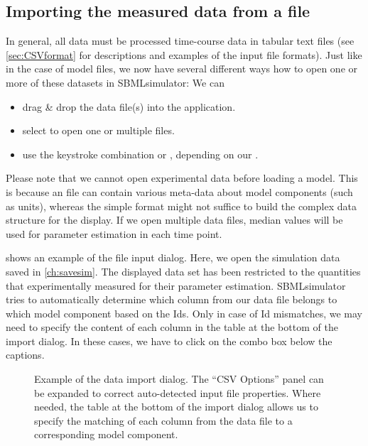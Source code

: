 \subsection{Importing the measured data from a file}
\label{sec:opendata}

In general, all data must be processed time-course data in tabular text files (see \cref{sec:CSVformat} for descriptions and examples of the input file formats).
Just like in the case of model files, we now have several different ways how to open one or more of these datasets in SBMLsimulator: We can
\begin{itemize}
  \item drag \& drop the data file(s) into the application.
  \item select  to open one or multiple files.
  \item use the keystroke combination  or , depending on our \OS.
\end{itemize}
Please note that we cannot open experimental data before loading a model.
This is because an \SBML file can contain various meta-data about model components (such as units), whereas the simple \CSV format might not suffice to build the complex data structure for the display.
If we open multiple data files, median values will be used for parameter estimation in each time point.

 shows an example of the file input dialog.
Here, we open the simulation data saved in \cref{ch:savesim}.
The displayed data set has been restricted to the quantities that \citeauthor{Bucher2011} experimentally measured for their parameter estimation.
SBMLsimulator tries to automatically determine which column from our data file belongs to which model component based on the \acp{Id}.
Only in case of \ac{Id} mismatches, we may need to specify the content of each column in the table at the bottom of the import dialog.
In these cases, we have to click on the combo box below the captions.
\begin{SCfigure}%
{}
\caption[Example of the data import dialog]{Example of the data import dialog.
The ``CSV Options'' panel can be expanded to correct auto-detected input file properties.
Where needed, the table at the bottom of the import dialog allows us to specify the matching of each column from the data file to a corresponding model component.}
\label{fig:inputdialog}
\end{SCfigure}

